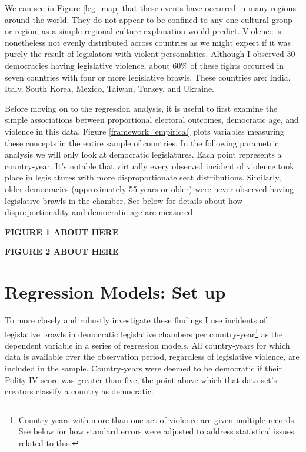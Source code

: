 \documentclass[a4paper]{article}\usepackage[]{graphicx}\usepackage[]{color}
\begin{document}
We can see in Figure \ref{leg_map} that these events have occurred in many regions around the world. They do not appear to be confined to any one cultural group or region, as a simple regional culture explanation would predict. Violence is nonetheless not evenly distributed across countries as we might expect if it was purely the result of legislators with violent personalities. Although I observed 30 democracies having legislative violence, about 60\% of these fights occurred in seven countries with four or more legislative brawls. These countries are: India, Italy, South Korea, Mexico, Taiwan, Turkey, and Ukraine.

Before moving on to the regression analysis, it is useful to first examine the simple associations between proportional electoral outcomes, democratic age, and violence in this data. Figure \ref{framework_empirical} plots variables measuring these concepts in the entire sample of countries. In the following parametric analysis we will only look at democratic legislatures. Each point represents a country-year. It's notable that virtually every observed incident of violence took place in legislatures with more disproportionate seat distributions. Similarly, older democracies (approximately 55 years or older) were never observed having legislative brawls in the chamber. See below for details about how disproportionality and democratic age are measured.

\vspace{0.5cm}

\textbf{FIGURE 1 ABOUT HERE}

\vspace{0.5cm}

\textbf{FIGURE 2 ABOUT HERE}

\vspace{0.5cm}

\section*{Regression Models: Set up}

To more closely and robustly investigate these findings I use incidents of legislative brawls in democratic legislative chambers per country-year\footnote{Country-years with more than one act of violence are given multiple records. See below for how standard errors were adjusted to address statistical issues related to this.} as the dependent variable in a series of regression models. All country-years for which data is available over the observation period, regardless of legislative violence, are included in the sample. Country-years were deemed to be democratic if their Polity IV score \citep{Marshall2009} was greater than five, the point above which that data set's creators classify a country as democratic.
\end{document}
